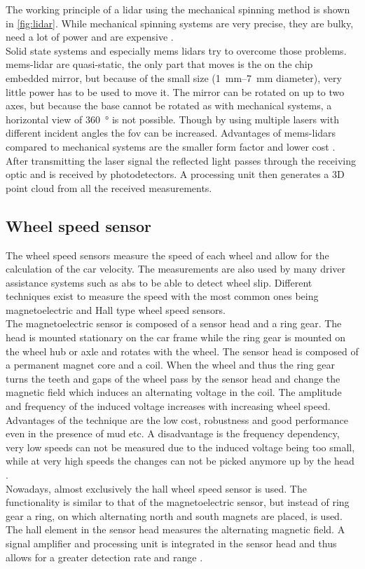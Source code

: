 The working principle of a \gls{lidar} using the mechanical spinning method is shown in \cref{fig:lidar}.
While mechanical spinning systems are very precise, they are bulky, need a lot of power and are expensive \cite{Fujii2005}.\\
Solid state systems and especially \gls{mems} \gls{lidar}s try to overcome those problems.
\gls{mems}-\gls{lidar} are quasi-static, the only part that moves is the on the chip embedded mirror, but because of the small size (\SIrange{1}{7}{\milli\metre} diameter), very little power has to be used to move it.
The mirror can be rotated on up to two axes, but because the base cannot be rotated as with mechanical systems, a horizontal view of \SI{360}{\degree} is not possible.
Though by using multiple lasers with different incident angles the \gls{fov} can be increased.
Advantages of \gls{mems}-\gls{lidar}s compared to mechanical systems are the smaller form factor and lower cost \cite{Wang2020}.\\
After transmitting the laser signal the reflected light passes through the receiving optic and is received by photodetectors.
A processing unit then generates a 3D point cloud from all the received measurements.


\subsection{Wheel speed sensor}
The wheel speed sensors measure the speed of each wheel and allow for the calculation of the car velocity.
The measurements are also used by many driver assistance systems such as \gls{abs} to be able to detect wheel slip.
Different techniques exist to measure the speed with the most common ones being magnetoelectric and Hall type wheel speed sensors.\\
The magnetoelectric sensor is composed of a sensor head and a ring gear.
The head is mounted stationary on the car frame while the ring gear is mounted on the wheel hub or axle and rotates with the wheel.
The sensor head is composed of a permanent magnet core and a coil.
When the wheel and thus the ring gear turns the teeth and gaps of the wheel pass by the sensor head and change the magnetic field which induces an alternating voltage in the coil.
The amplitude and frequency of the induced voltage increases with increasing wheel speed.
Advantages of the technique are the low cost, robustness and good performance even in the presence of mud etc.
A disadvantage is the frequency dependency, very low speeds can not be measured due to the induced voltage being too small, while at very high speeds the changes can not be picked anymore up by the head \cite{AutoReif2014}.\\
Nowadays, almost exclusively the hall wheel speed sensor is used.
The functionality is similar to that of the magnetoelectric sensor, but instead of ring gear a ring, on which alternating north and south magnets are placed, is used.
The hall element in the sensor head measures the alternating magnetic field.
A signal amplifier and processing unit is integrated in the sensor head and thus allows for a greater detection rate and range \cite{Re2011}.


